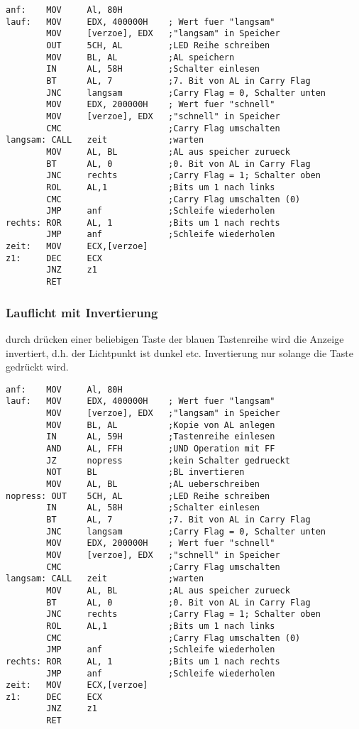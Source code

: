 \documentclass[a4paper,10pt,titlepage]{scrartcl}
\begin{document}
\begin{lstlisting}
anf:    MOV     Al, 80H
lauf:   MOV     EDX, 400000H    ; Wert fuer "langsam"
        MOV     [verzoe], EDX   ;"langsam" in Speicher
        OUT     5CH, AL         ;LED Reihe schreiben
        MOV     BL, AL          ;AL speichern
        IN      AL, 58H         ;Schalter einlesen
        BT      AL, 7           ;7. Bit von AL in Carry Flag
        JNC     langsam         ;Carry Flag = 0, Schalter unten
        MOV     EDX, 200000H    ; Wert fuer "schnell"
        MOV     [verzoe], EDX   ;"schnell" in Speicher
        CMC                     ;Carry Flag umschalten
langsam: CALL   zeit            ;warten
        MOV     AL, BL          ;AL aus speicher zurueck
        BT      AL, 0           ;0. Bit von AL in Carry Flag
        JNC     rechts          ;Carry Flag = 1; Schalter oben 
        ROL     AL,1            ;Bits um 1 nach links
        CMC                     ;Carry Flag umschalten (0)
        JMP     anf             ;Schleife wiederholen
rechts: ROR     AL, 1           ;Bits um 1 nach rechts
        JMP     anf             ;Schleife wiederholen
zeit:   MOV     ECX,[verzoe]
z1:     DEC     ECX
        JNZ     z1
        RET
\end{lstlisting}


\subsubsection*{Lauflicht mit Invertierung}
durch drücken einer beliebigen Taste der blauen Tastenreihe wird die Anzeige invertiert, d.h. der Lichtpunkt ist dunkel etc. Invertierung nur solange die Taste gedrückt wird.
\begin{lstlisting}
anf:    MOV     Al, 80H
lauf:   MOV     EDX, 400000H    ; Wert fuer "langsam"
        MOV     [verzoe], EDX   ;"langsam" in Speicher
        MOV     BL, AL          ;Kopie von AL anlegen
        IN      AL, 59H         ;Tastenreihe einlesen
        AND     AL, FFH         ;UND Operation mit FF
        JZ      nopress         ;kein Schalter gedrueckt
        NOT     BL              ;BL invertieren
        MOV     AL, BL          ;AL ueberschreiben
nopress: OUT    5CH, AL         ;LED Reihe schreiben
        IN      AL, 58H         ;Schalter einlesen
        BT      AL, 7           ;7. Bit von AL in Carry Flag
        JNC     langsam         ;Carry Flag = 0, Schalter unten
        MOV     EDX, 200000H    ; Wert fuer "schnell"
        MOV     [verzoe], EDX   ;"schnell" in Speicher
        CMC                     ;Carry Flag umschalten
langsam: CALL   zeit            ;warten
        MOV     AL, BL          ;AL aus speicher zurueck
        BT      AL, 0           ;0. Bit von AL in Carry Flag
        JNC     rechts          ;Carry Flag = 1; Schalter oben
        ROL     AL,1            ;Bits um 1 nach links
        CMC                     ;Carry Flag umschalten (0)
        JMP     anf             ;Schleife wiederholen
rechts: ROR     AL, 1           ;Bits um 1 nach rechts
        JMP     anf             ;Schleife wiederholen
zeit:   MOV     ECX,[verzoe]
z1:     DEC     ECX
        JNZ     z1
        RET
\end{lstlisting}
\end{document}
